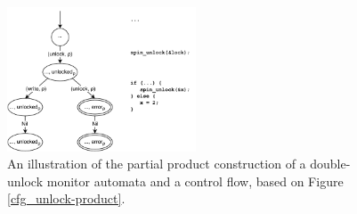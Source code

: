 \begin{figure}[H]
    \centering
    \includegraphics[width=0.5\textwidth]{implementation/figures/cfg_unlock-product-partial}
    \caption{An illustration of the partial product construction of a double-unlock monitor automata and a control flow, based on Figure \ref{cfg_unlock-product}.}
    \label{cfg_unlock-product-partial}
\end{figure}